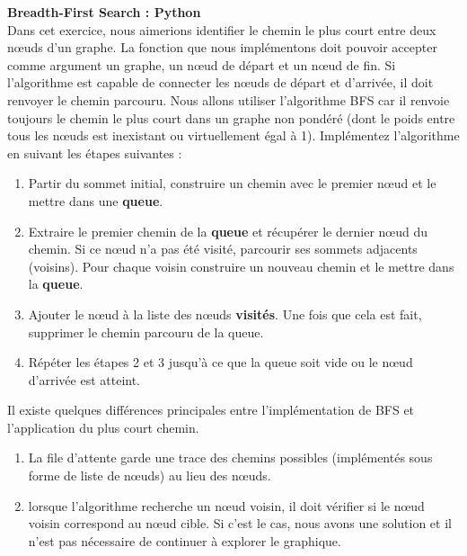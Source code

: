 \begin{Exercice}[15 minutes]\textbf{Breadth-First Search : Python
}\\
	Dans cet exercice, nous aimerions identifier le chemin le plus court entre deux nœuds d'un graphe.
	La fonction que nous implémentons doit pouvoir accepter comme argument un graphe, un nœud de départ et un nœud de fin. Si l'algorithme est capable de connecter les nœuds 			de départ et d'arrivée, il doit renvoyer le chemin parcouru. Nous allons utiliser l'algorithme BFS car il renvoie toujours le chemin le plus court dans un graphe non pondéré (dont le poids entre tous les nœuds est inexistant ou virtuellement égal à 1).
	    Implémentez l'algorithme en suivant les étapes suivantes :\\
	\begin{enumerate}
	    
		\item Partir du sommet initial, construire un chemin avec le premier nœud et le mettre dans une \textbf{queue}.
		\item Extraire le premier chemin de la \textbf{queue} et récupérer le dernier nœud du chemin. Si ce nœud n'a pas été visité, parcourir ses sommets adjacents (voisins). Pour chaque voisin construire un nouveau chemin et le mettre dans la \textbf{queue}.
		\item Ajouter le nœud à la liste des nœuds \textbf{visités}. Une fois que cela est fait, supprimer le chemin  parcouru de la queue.
		\item Répéter les étapes 2 et 3 jusqu'à ce que la queue soit vide ou le nœud d'arrivée est atteint.\\
	\end{enumerate}

	
    	\begin{conseil}
		Il existe quelques différences principales entre l'implémentation de BFS et  l'application du plus court chemin.
		
        		\begin{enumerate}
			\item La file d'attente garde une trace des chemins possibles (implémentés sous forme de liste de nœuds) au lieu des nœuds.
	           	\item lorsque l'algorithme recherche un nœud voisin, il doit vérifier si le nœud voisin correspond au nœud cible. Si c'est le cas, nous avons une solution et il n'est pas 					nécessaire de continuer à explorer le graphique.
        		\end{enumerate}

    	\end{conseil}

	\begin{solution}
		
	\end{solution}
\end{Exercice}

